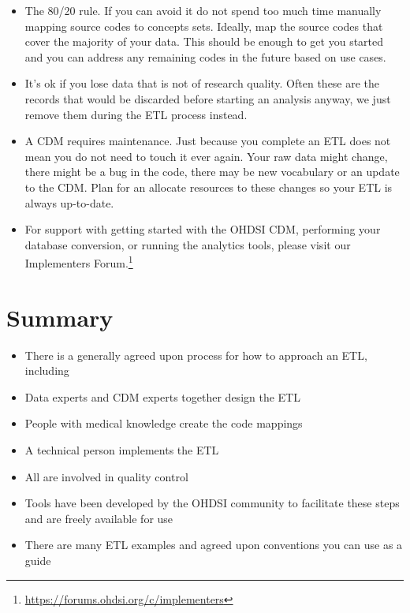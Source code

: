 \documentclass[11pt]{book}
\providecommand{\tightlist}{%
  \setlength{\itemsep}{0pt}\setlength{\parskip}{0pt}}
\let\rmarkdownfootnote\footnote%
\def\footnote{\protect\rmarkdownfootnote}
\theoremstyle{definition}
\theoremstyle{definition}
\theoremstyle{definition}
\theoremstyle{remark}
\let\BeginKnitrBlock\begin \let\EndKnitrBlock\end
\begin{document}
\begin{itemize}
\tightlist
\item
  The 80/20 rule. If you can avoid it do not spend too much time
  manually mapping source codes to concepts sets. Ideally, map the
  source codes that cover the majority of your data. This should be
  enough to get you started and you can address any remaining codes in
  the future based on use cases.
\item
  It's ok if you lose data that is not of research quality. Often these
  are the records that would be discarded before starting an analysis
  anyway, we just remove them during the ETL process instead.
\item
  A CDM requires maintenance. Just because you complete an ETL does not
  mean you do not need to touch it ever again. Your raw data might
  change, there might be a bug in the code, there may be new vocabulary
  or an update to the CDM. Plan for an allocate resources to these
  changes so your ETL is always up-to-date.
\item
  For support with getting started with the OHDSI CDM, performing your
  database conversion, or running the analytics tools, please visit our
  Implementers Forum.\footnote{\url{https://forums.ohdsi.org/c/implementers}}
\end{itemize}

\section{Summary}\label{summary-3}

\BeginKnitrBlock{rmdsummary}
\begin{itemize}
\item
  There is a generally agreed upon process for how to approach an ETL,
  including
\item
  Data experts and CDM experts together design the ETL
\item
  People with medical knowledge create the code mappings
\item
  A technical person implements the ETL
\item
  All are involved in quality control
\item
  Tools have been developed by the OHDSI community to facilitate these
  steps and are freely available for use
\item
  There are many ETL examples and agreed upon conventions you can use as
  a guide
\end{itemize}
\EndKnitrBlock{rmdsummary}
\end{document}
